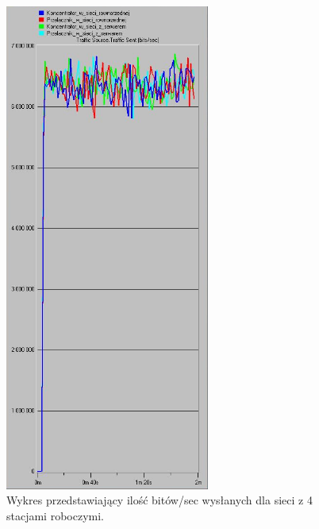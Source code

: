 \documentclass{article}
\begin{document}
\begin{figure}[H]
  \centering
  \includegraphics[width=0.60\textwidth]{screens/4_sent.png}
 \caption{Wykres przedstawiający ilość bitów/sec wysłanych dla sieci z 4 stacjami roboczymi.}
 \label{fig:4stacjes}
\end{figure}
\end{document}
